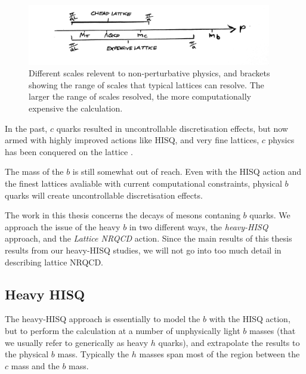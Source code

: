 \begin{figure}
  \vspace{-10pt}
  \begin{center}
    \includegraphics[width=
      0.95\textwidth]{images/scales.jpg}
  \end{center}
  \vspace{-15pt}
  \caption{Different scales relevent to non-perturbative physics, and brackets showing the range of scales that typical lattices can resolve. The larger the range of scales resolved, the more computationally expensive the calculation.}
\end{figure}

In the past, $c$ quarks resulted in uncontrollable discretisation effects, but now armed with highly improved actions like HISQ, and very fine lattices, $c$ physics has been conquered on the lattice \cite{Davies:2008nq,Davies:2008hs,Koponen:2011ev,Na:2011mc,Na:2012uh,Na:2012iu,Koponen:2013ila}. 

The mass of the $b$ is still somewhat out of reach. Even with the HISQ action and the finest lattices avaliable with current computational constraints, physical $b$ quarks will create uncontrollable discretisation effects.

The work in this thesis concerns the decays of mesons contaning $b$ quarks. We approach the issue of the heavy $b$ in two different ways, the {\it{heavy-HISQ}} approach, and the {\it{Lattice NRQCD}} action. Since the main results of this thesis results from our heavy-HISQ studies, we will not go into too much detail in describing lattice NRQCD.

\subsection{Heavy HISQ}

The heavy-HISQ approach is essentially to model the $b$ with the HISQ action, but to perform the calculation at a number of unphysically light $b$ masses (that we usually refer to generically as heavy $h$ quarks), and extrapolate the results to the physical $b$ mass. Typically the $h$ masses span most of the region between the $c$ mass and the $b$ mass.

